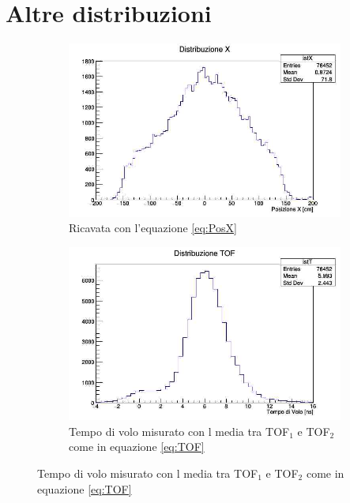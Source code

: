 \documentclass[a4paper]{article}
\begin{document}
\section{Altre distribuzioni}
\begin{figure}[H]
\begin{subfigure}[b]{0.4\textwidth}
\includegraphics[width=\textwidth]{./immagini/TimeOfFlight/DistrX.jpg}
\caption{Ricavata con l'equazione \ref{eq:PosX}}
\label{fig:DistrX}
\end{subfigure}
\hfill
\begin{subfigure}[b]{0.4\textwidth}
\includegraphics[width=\textwidth]{./immagini/TimeOfFlight/DistrTOF.jpg}
\caption{Tempo di volo misurato con l media tra TOF$_1$ e TOF$_2$ come in equazione \ref{eq:TOF}}
\label{fig:DistrTof}
\end{subfigure}
\end{figure}
\end{document}
